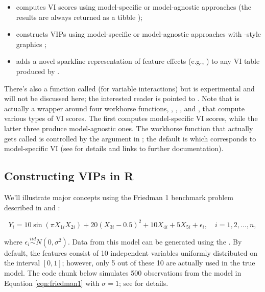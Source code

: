 \begin{itemize}
 
  \item {} computes VI scores using model-specific or model-agnostic approaches (the results are always returned as a tibble \citep{R-tibble});
  
  \item {} constructs VIPs using model-specific or model-agnostic approaches with -style graphics \citep{R-ggplot2};
  
  \item {} adds a novel sparkline representation of feature effects (e.g., ) to any VI table produced by .

\end{itemize}

There's also a function called  (for variable interactions)
but is experimental and will not be discussed here; the interested
reader is pointed to \citet{greenwell-simple-2018}. Note that
 is actually a wrapper around four workhorse functions,
, , , and
, that compute various types of VI scores. The first
computes model-specific VI scores, while the latter three produce
model-agnostic ones. The workhorse function that actually gets called is
controlled by the  argument in ; the default is
 which corresponds to model-specific VI (see
 for details and links to further documentation).

\hypertarget{constructing-vips-in-r}{%
\subsection{Constructing VIPs in R}\label{constructing-vips-in-r}}

We'll illustrate major concepts using the Friedman 1 benchmark problem
described in \citet{multivariate-friedman-1991} and
\citet{bagging-breiman-1996}:

\begin{equation}
  Y_i = 10 \sin\left(\pi X_{1i} X_{2i}\right) + 20 \left(X_{3i} - 0.5\right) ^ 2 + 10 X_{4i} + 5 X_{5i} + \epsilon_i, \quad i = 1, 2, \dots, n,
\label{eqn:friedman1}
\end{equation}

where \(\epsilon_i \stackrel{iid}{\sim} N\left(0, \sigma^2\right)\).
Data from this model can be generated using the
. By default, the features consist of 10
independent variables uniformly distributed on the interval
\(\left[0,1\right]\); however, only 5 out of these 10 are actually used
in the true model. The code chunk below simulates 500 observations from
the model in Equation \eqref{eqn:friedman1} with \(\sigma = 1\); see
 for details.

